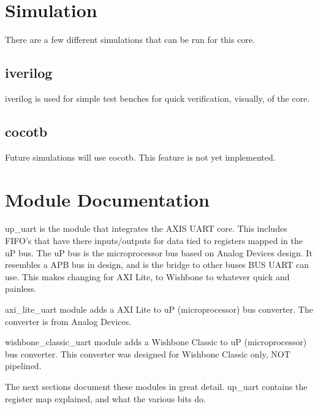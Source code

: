 \newpage

\section{Simulation}
\par
There are a few different simulations that can be run for this core.

\subsection{iverilog}
\par
iverilog is used for simple test benches for quick verification, visually, of the core.

\subsection{cocotb}
\par
Future simulations will use cocotb. This feature is not yet implemented.

\newpage

\section{Module Documentation} \label{Module Documentation}

\par
up\_uart is the module that integrates the AXIS UART core.
This includes FIFO's that have there inputs/outputs for data tied to registers mapped in the uP bus.
The uP bus is the microprocessor bus based on Analog Devices design. It resembles a APB bus in design,
and is the bridge to other buses BUS UART can use. This makes changing for AXI Lite, to Wishbone to whatever
quick and painless.

\par
axi\_lite\_uart module adds a AXI Lite to uP (microprocessor) bus converter. The converter is
from Analog Devices.

\par
wishbone\_classic\_uart module adds a Wishbone Classic to uP (microprocessor) bus converter. This
converter was designed for Wishbone Classic only, NOT pipelined.

\vspace{15mm}
\par
The next sections document these modules in great detail. up\_uart contains the register map explained, and what the various bits do.

